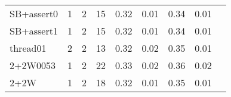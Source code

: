 {\begin{tabular}{l|r|r|r|r|r|r|r|l}
SB+assert0                                  & 1                                                                                                 & 2                                                                                                & 15                                                                                                                   & 0.32                            & 0.01                    & {\color[HTML]{00009B} 0.34}    & 0.01                       \\
SB+assert1                                  & 1                                                                                                 & 2                                                                                                & 15                                                                                                                   & 0.32                            & 0.01                    & {\color[HTML]{00009B} 0.34}    & 0.01                       \\
thread01                                    & 2                                                                                                 & 2                                                                                                & 13                                                                                                                   & 0.32                            & 0.02                    & {\color[HTML]{00009B} 0.35}    & 0.01                       \\
2+2W0053                                    & 1                                                                                                 & 2                                                                                                & 22                                                                                                                   & 0.33                            & 0.02                    & {\color[HTML]{00009B} 0.36}    & 0.02                       \\
2+2W                                        & 1                                                                                                 & 2                                                                                                & 18                                                                                                                   & 0.32                            & 0.01                    & {\color[HTML]{00009B} 0.35}    & 0.01                       \\

\end{tabular}}
